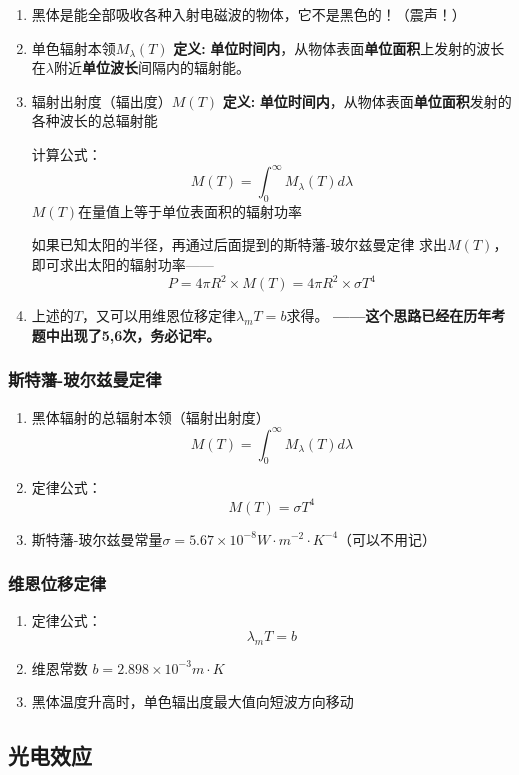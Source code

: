 \documentclass{ctexart}
\begin{document}
\begin{enumerate}
	\item 黑体是能全部吸收各种入射电磁波的物体，它不是黑色的！（震声！）
	\item 单色辐射本领$M_\lambda(T)$
	\textbf{定义:}
	\textbf{单位时间内}，从物体表面\textbf{单位面积}上发射的波长在$\lambda$附近\textbf{单位波长}间隔内的辐射能。
	\item 辐射出射度（辐出度）$M(T)$
	\textbf{定义:}
	\textbf{单位时间内}，从物体表面\textbf{单位面积}发射的各种波长的总辐射能
	
	计算公式：$$M(T)=\int_0^\infty M_\lambda(T)d\lambda$$
	$M(T)$在量值上等于单位表面积的辐射功率

	如果已知太阳的半径，再通过后面提到的斯特藩-玻尔兹曼定律
	求出$M(T)$，即可求出太阳的辐射功率——
	$$P=4\pi R^2\times M(T)=4\pi R^2\times \sigma T^4$$

	\item 上述的$T$，又可以用维恩位移定律$\lambda_m T=b$求得。
    \textbf{——这个思路已经在历年考题中出现了5,6次，务必记牢。}

\end{enumerate}

\subsubsection{斯特藩-玻尔兹曼定律}
\begin{enumerate}
	\item 黑体辐射的总辐射本领（辐射出射度）$$M(T)=\int_0^\infty M_\lambda(T)d\lambda$$
	\item 定律公式：$$M(T)=\sigma T^4$$
	\item 斯特藩-玻尔兹曼常量$\sigma =
	5.67\times 10^{-8}W\cdot m^{-2}\cdot K^{-4}$（可以不用记）
\end{enumerate}

\subsubsection{维恩位移定律}
\begin{enumerate}
	\item 定律公式：$$\lambda_m T=b$$
	\item 维恩常数 $b=2.898\times 10^{-3}m\cdot K$
	\item 黑体温度升高时，单色辐出度最大值向短波方向移动
\end{enumerate}

\subsection{光电效应}
\end{document}
